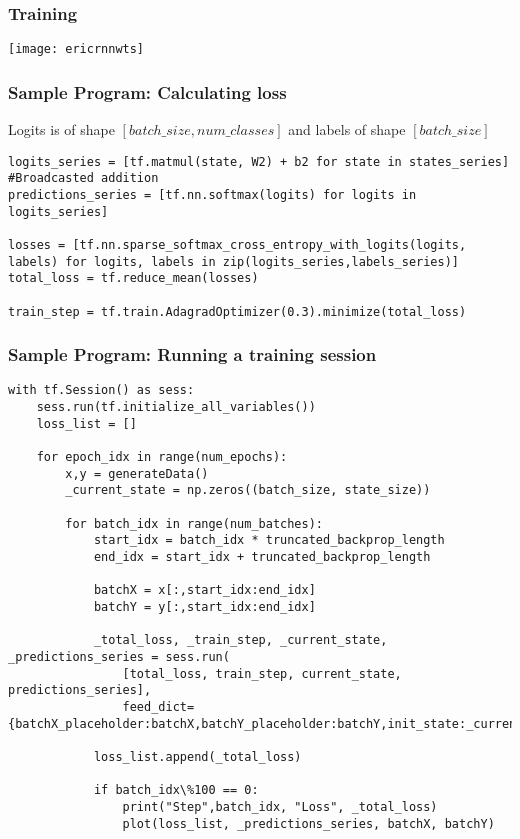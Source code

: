 \begin{frame}[fragile] \frametitle{Training}

\begin{center}
\texttt{[image: ericrnnwts]}
\end{center}
\end{frame}

\begin{frame}[fragile] \frametitle{Sample Program: Calculating loss}
Logits is of shape $[batch\_size, num\_classes]$ and labels of shape $[batch\_size]$

\begin{lstlisting}
logits_series = [tf.matmul(state, W2) + b2 for state in states_series] #Broadcasted addition
predictions_series = [tf.nn.softmax(logits) for logits in logits_series]

losses = [tf.nn.sparse_softmax_cross_entropy_with_logits(logits, labels) for logits, labels in zip(logits_series,labels_series)]
total_loss = tf.reduce_mean(losses)

train_step = tf.train.AdagradOptimizer(0.3).minimize(total_loss)
\end{lstlisting}
 \end{frame}

\begin{frame}[fragile] \frametitle{Sample Program: Running a training session}

\begin{lstlisting}
with tf.Session() as sess:
    sess.run(tf.initialize_all_variables())
    loss_list = []

    for epoch_idx in range(num_epochs):
        x,y = generateData()
        _current_state = np.zeros((batch_size, state_size))
        
        for batch_idx in range(num_batches):
            start_idx = batch_idx * truncated_backprop_length
            end_idx = start_idx + truncated_backprop_length

            batchX = x[:,start_idx:end_idx]
            batchY = y[:,start_idx:end_idx]

            _total_loss, _train_step, _current_state, _predictions_series = sess.run(
                [total_loss, train_step, current_state, predictions_series],
                feed_dict={batchX_placeholder:batchX,batchY_placeholder:batchY,init_state:_current_state})

            loss_list.append(_total_loss)

            if batch_idx\%100 == 0:
                print("Step",batch_idx, "Loss", _total_loss)
                plot(loss_list, _predictions_series, batchX, batchY)

\end{lstlisting}
\end{frame}


